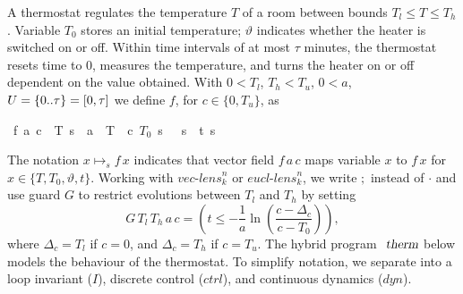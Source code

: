 \documentclass[envcountsame,envcountsect]{llncs}
\begin{document}
\begin{example}\label{ex:therm-sol}
  A thermostat regulates the temperature $T$ of a room between bounds
  $T_l\le T\le T_h$. Variable $T_0$ stores an initial temperature;
  $\vartheta$ indicates whether the heater is switched on or off.
  Within time intervals of at most $\tau$ minutes, the thermostat
  resets time to $0$, measures the temperature, and turns the heater
  on or off dependent on the value obtained.  With $0<T_l$, $T_h<T_u$,
  $0 < a$,
  $U={\emph{$\{$}}{0}{\emph{$\mathord.$}}{\emph{$\mathord.$}}{\emph{$\tau$}}{\emph{$\}$}}=[0,\tau]$ we define $f$, for $c\in\{0,T_u\}$, as
\begin{isabellebody}
\isanewline
{}\
{\isachardoublequoteopen}f\ a\ c\ {\isasymequiv}\ {\isacharbrackleft}T\ {\isasymmapsto}\isactrlsub s\ {\isacharminus}\ {\isacharparenleft}a\ {\isacharasterisk}\ {\isacharparenleft}T\ {\isacharminus}\ c{\isacharparenright}{\isacharparenright}{\isacharcomma}\ $T_0$\ {\isasymmapsto}\isactrlsub s\ {}{\isacharcomma}\ {\isasymtheta}\ {\isasymmapsto}\isactrlsub s\ {}{\isacharcomma}\ t\ {\isasymmapsto}\isactrlsub s\ {}{\isacharbrackright}{\isachardoublequoteclose}\isanewline
\end{isabellebody} 
\noindent The notation $x\mapsto_s f\, x$ indicates that vector field $f\, a\, c$ maps variable $x$ to $f\, x$ for $x \in \{T,T_0,\vartheta,t\}$. Working with $\textit{vec-lens}^n_k$ or
$\textit{eucl-lens}^n_k $, we write $;$ instead of $\cdot$ and use guard $G$ to restrict evolutions
between $T_l$ and $T_h$ by setting
\begin{equation*}
G\, T_l\, T_h\, a\, c = \left(t\leq -\frac{1}{a}\ln\left(\frac{c-\Delta_c}{c-T_0}\right)\right),
\end{equation*}
where $\Delta_c = T_l$ if $c=0$, and $\Delta_c = T_h$ if $c=T_u$. The
hybrid program $\isa{therm}$ below models the
behaviour of the thermostat. To simplify notation, we separate into
a loop invariant ($I$), discrete control ($ctrl$), and continuous
dynamics ($dyn$).

\begin{isabellebody}


\end{isabellebody}
\end{example}
\end{document}
